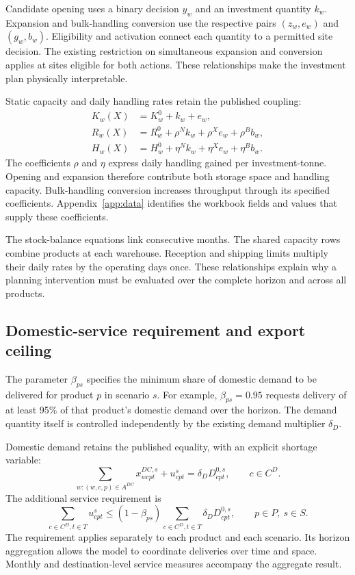 \documentclass[11pt,a4paper]{article}
\begin{document}
Candidate opening uses a binary decision $y_w$ and an investment quantity $k_w$. Expansion and bulk-handling conversion use the respective pairs $(z_w,e_w)$ and $(g_w,b_w)$. Eligibility and activation connect each quantity to a permitted site decision. The existing restriction on simultaneous expansion and conversion applies at sites eligible for both actions. These relationships make the investment plan physically interpretable.

Static capacity and daily handling rates retain the published coupling:
\begin{align}
K_w(X)&=K_w^0+k_w+e_w,\label{eq:static}\\
R_w(X)&=R_w^0+\rho^Nk_w+\rho^Xe_w+\rho^Bb_w,\\
H_w(X)&=H_w^0+\eta^Nk_w+\eta^Xe_w+\eta^Bb_w.
\label{eq:handling}
\end{align}
The coefficients $\rho$ and $\eta$ express daily handling gained per investment-tonne. Opening and expansion therefore contribute both storage space and handling capacity. Bulk-handling conversion increases throughput through its specified coefficients. Appendix~\ref{app:data} identifies the workbook fields and values that supply these coefficients.

The stock-balance equations link consecutive months. The shared capacity rows combine products at each warehouse. Reception and shipping limits multiply their daily rates by the operating days once. These relationships explain why a planning intervention must be evaluated over the complete horizon and across all products.

\subsection{Domestic-service requirement and export ceiling}
\label{sec:policies}

The parameter $\beta_{ps}$ specifies the minimum share of domestic demand to be delivered for product $p$ in scenario $s$. For example, $\beta_{ps}=0.95$ requests delivery of at least 95\% of that product's domestic demand over the horizon. The demand quantity itself is controlled independently by the existing demand multiplier $\delta_D$.

Domestic demand retains the published equality, with an explicit shortage variable:
\begin{equation}
 \sum_{w:(w,c,p)\in A^{DC}}x^{DC,s}_{wcpt}+u^s_{cpt}
   =\delta_D D^{0,s}_{cpt},\qquad c\in C^D.
 \label{eq:domestic}
\end{equation}
The additional service requirement is
\begin{equation}
 \sum_{c\in C^D,t\in T}u^s_{cpt}
 \le (1-\beta_{ps})\sum_{c\in C^D,t\in T}\delta_D D^{0,s}_{cpt},
 \qquad p\in P,\ s\in S.
 \label{eq:service}
\end{equation}
The requirement applies separately to each product and each scenario. Its horizon aggregation allows the model to coordinate deliveries over time and space. Monthly and destination-level service measures accompany the aggregate result.
\end{document}
